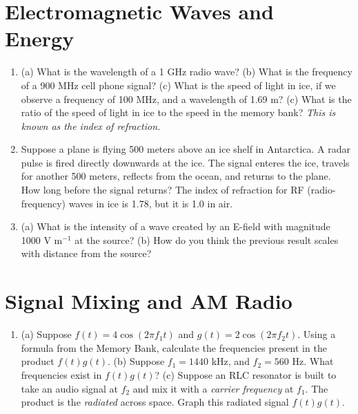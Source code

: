 \documentclass{article}
\begin{document}
\section{Electromagnetic Waves and \\ Energy}

\begin{enumerate}
\item (a) What is the wavelength of a 1 GHz radio wave? (b) What is the frequency of a 900 MHz cell phone signal? (c) What is the speed of light in ice, if we observe a frequency of 100 MHz, and a wavelength of 1.69 m? (c) What is the ratio of the speed of light in ice to the speed in the memory bank? \textit{This is known as the index of refraction.}\\ \vspace{1cm}
\item Suppose a plane is flying 500 meters above an ice shelf in Antarctica.  A radar pulse is fired directly downwards at the ice.  The signal enteres the ice, travels for another 500 meters, reflects from the ocean, and returns to the plane.  How long before the signal returns?  The index of refraction for RF (radio-frequency) waves in ice is 1.78, but it is 1.0 in air. \\ \vspace{1cm}
\item (a) What is the intensity of a wave created by an E-field with magnitude 1000 V m$^{-1}$ at the source? (b) How do you think the previous result scales with distance from the source? \\ \vspace{2cm}
\end{enumerate}

\section{Signal Mixing and AM Radio}

\begin{enumerate}
\item (a) Suppose $f(t) = 4\cos(2\pi f_1 t)$ and $g(t) = 2\cos(2\pi f_2 t)$.  Using a formula from the Memory Bank, calculate the frequencies present in the product $f(t) g(t)$. (b) Suppose $f_1 = 1440$ kHz, and $f_2 = 560$ Hz.  What frequencies exist in $f(t) g(t)$? (c) Suppose an RLC resonator is built to take an audio signal at $f_2$ and mix it with a \textit{carrier frequency} at $f_1$.  The product is the \textit{radiated} across space.  Graph this radiated signal $f(t) g(t)$.
\end{enumerate}
\end{document}
